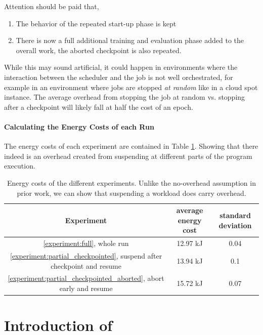 Attention should be paid that,

\begin{enumerate}
    \item The behavior of the repeated start-up phase is kept
    \item There is now a full additional training and evaluation phase added to the overall work, the aborted checkpoint is also repeated.
\end{enumerate}

While this may sound artificial, it could happen in environments where the interaction between the scheduler and the job is not well orchestrated, for example in an environment where jobs are stopped \emph{at random} like in a cloud spot instance. 
The average overhead from stopping the job at random vs. stopping after a checkpoint will likely fall at half the cost of an epoch.

\paragraph{Calculating the Energy Costs of each Run}

The energy costs of each experiment are contained in Table \ref{tab:experiment_overhead}. 
Showing that there indeed is an overhead created from suspending at different parts of the program execution.

\begin{table}[h!]
    \centering
    \begin{tabular}{|c|c|c|}
    \hline
        Experiment & average energy cost & standard deviation \\ \hline
        \ref{experiment:full}, whole run &  12.97 kJ & 0.04 \\ \hline
        \ref{experiment:partial_checkpointed}, suspend after checkpoint and resume &  13.94  kJ & 0.1 \\ \hline
        \ref{experiment:partial_checkpointed_aborted}, abort early and resume &  15.72 kJ & 0.07 \\ \hline
    \end{tabular}
    \caption{Energy costs of the different experiments. Unlike the no-overhead assumption in prior work, we can show that suspending a workload does carry overhead.}
\label{tab:experiment_overhead}
\end{table}

\section{Introduction of \modelname} \label{sec:improving_the_model}

